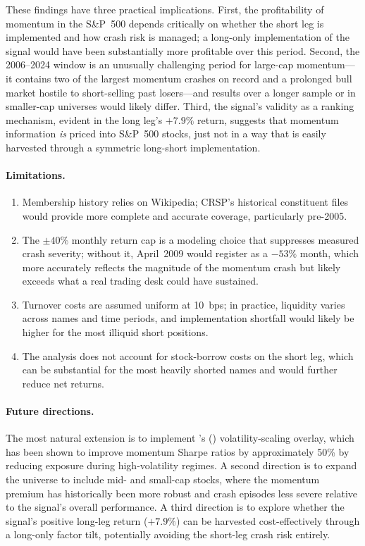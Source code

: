 \documentclass[11pt]{article}
\begin{document}
These findings have three practical implications. First, the profitability of momentum
in the S\&P~500 depends critically on whether the short leg is implemented and how
crash risk is managed; a long-only implementation of the signal would have been
substantially more profitable over this period. Second, the 2006--2024 window is
an unusually challenging period for large-cap momentum---it contains two of the
largest momentum crashes on record and a prolonged bull market hostile to short-selling
past losers---and results over a longer sample or in smaller-cap universes would likely
differ. Third, the signal's validity as a ranking mechanism, evident in the long leg's
$+7.9\%$ return, suggests that momentum information \emph{is} priced into S\&P~500
stocks, just not in a way that is easily harvested through a symmetric long-short
implementation.

\paragraph{Limitations.}
\begin{enumerate}[label=(\roman*), leftmargin=*]
  \item Membership history relies on Wikipedia; CRSP's historical constituent files
        would provide more complete and accurate coverage, particularly pre-2005.
  \item The $\pm40\%$ monthly return cap is a modeling choice that suppresses measured
        crash severity; without it, April~2009 would register as a $-53\%$ month,
        which more accurately reflects the magnitude of the momentum crash but
        likely exceeds what a real trading desk could have sustained.
  \item Turnover costs are assumed uniform at 10~bps; in practice, liquidity varies
        across names and time periods, and implementation shortfall would likely
        be higher for the most illiquid short positions.
  \item The analysis does not account for stock-borrow costs on the short leg, which
        can be substantial for the most heavily shorted names and would further
        reduce net returns.
\end{enumerate}

\paragraph{Future directions.}
The most natural extension is to implement \citeauthor{Barroso2015}'s (\citeyear{Barroso2015})
volatility-scaling overlay, which has been shown to improve momentum Sharpe ratios by
approximately 50\% by reducing exposure during high-volatility regimes. A second direction
is to expand the universe to include mid- and small-cap stocks, where the momentum
premium has historically been more robust and crash episodes less severe relative to
the signal's overall performance. A third direction is to explore whether the signal's
positive long-leg return ($+7.9\%$) can be harvested cost-effectively through a
long-only factor tilt, potentially avoiding the short-leg crash risk entirely.
\end{document}
